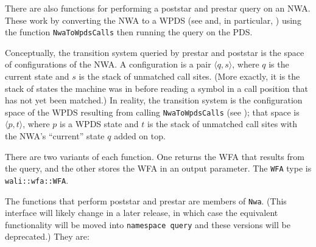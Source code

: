 There are also functions for performing a poststar and prestar
query on an NWA. These work by converting the NWA to a WPDS (see
 and, in particular, ) using
the function \texttt{NwaToWpdsCalls} then running the query on the PDS.

Conceptually, the transition system queried by prestar and poststar is the space of
configurations of the NWA. A configuration is a pair $\langle q, s\rangle$,
where $q$ is the current state and $s$ is the stack of unmatched call
sites. (More exactly, it is the stack of states the machine was in before
reading a symbol in a call position that has not yet been matched.) In
reality,  the transition system is the configuration space of the WPDS
resulting from calling \texttt{NwaToWpdsCalls} (see
); that space is
$\langle p, t\rangle$, where $p$ is a WPDS state and $t$ is the stack of
unmatched call sites with the NWA's ``current'' state $q$ added on top.

There are two variants of each function. One returns the WFA that results from
the query, and the other stores the WFA in an output parameter. The
\texttt{WFA} type is \texttt{wali::wfa::WFA}.

\begin{comment}
The functions that perform poststar and prestar are in the namespace
\texttt{opennwa::query} and are declared in the header
\texttt{opennwa/query/weighted.hpp}. They are:
\begin{functionlist}
  \functionDefEarly{WFA}{prestar}{Nwa const \& nwa, WFA const \& input, WeightGen \& wg}{}
  \functionDefEarly{void}{prestar}{Nwa const \& nwa, WFA const \& input, WFA \& output, WeightGen \& wg}{}
    Computes the prestar of the configurations specified by
    \texttt{input}, using the weights generated by \texttt{wg}. Either
    returns the result or stores it in the parameter \texttt{output}.

  \functionDefFirstEarly{WFA}{poststar}{Nwa const \& nwa, WFA const \& input, WeightGen \& wg}{}
  \functionDefEarly{void}{poststar}{Nwa const \& nwa, WFA const \& input, WFA \& output, WeightGen \& wg}{}
    Computes the poststar of the configurations specified by
    \texttt{input}, using the weights generated by \texttt{wg}. Either
    returns the result or stores it in the parameter \texttt{output}.
\end{functionlist}
\end{comment}

The functions that perform poststar and prestar are members of
\texttt{Nwa}. (This interface will likely change in a later release, in which
case the equivalent functionality will be moved into \texttt{namespace
  query} and these versions will be deprecated.)  They are:

